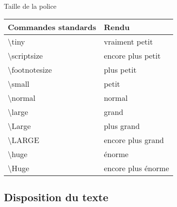 \begin{frame}{Taille de la police}
	\begin{tabularx}{\textwidth}{l|l}
		\arrayrulecolor{grisPrimaire!40}
		\textbf{Commandes standards} 	& 	\textbf{Rendu}	\\
		\hline
		\textbackslash tiny				&	{\tiny vraiment petit}	\\
		\textbackslash scriptsize		&	{\scriptsize encore plus petit}	\\
		\textbackslash footnotesize		&	{\footnotesize plus petit}	\\
		\textbackslash small			&	{\small petit}	\\
		\textbackslash normal			&	{\normalsize normal}	\\
		\textbackslash large			&	{\large grand}	\\
		\textbackslash Large			&	{\Large plus grand}	\\
		\textbackslash LARGE			&	{\LARGE encore plus grand}	\\
		\textbackslash huge				&	{\huge énorme}	\\
		\textbackslash Huge				&	{\Huge encore plus énorme}		
	\end{tabularx}
\end{frame}

\subsection{Disposition du texte}

